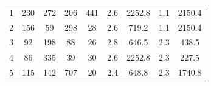 \begin{table}[ht!]
\begin{tabular}{ccccccccc}
		\multicolumn{1}{c|}{1}               & 230                                                          & 272                                                               & 206                                                              & \multicolumn{1}{c|}{441}                                                              & 2.6                                                           & 2252.8                                                             & 1.1                                                               & 2150.4                                                            \\
		\multicolumn{1}{c|}{2}               & 156                                                          & 59                                                                & 298                                                              & \multicolumn{1}{c|}{28}                                                               & 2.6                                                           & 719.2                                                              & 1.1                                                               & 2150.4                                                            \\
		\multicolumn{1}{c|}{3}               & 92                                                           & 198                                                               & 88                                                               & \multicolumn{1}{c|}{26}                                                               & 2.8                                                           & 646.5                                                              & 2.3                                                               & 438.5                                                             \\
		\multicolumn{1}{c|}{4}               & 86                                                           & 335                                                               & 39                                                               & \multicolumn{1}{c|}{30}                                                               & 2.6                                                           & 2252.8                                                             & 2.3                                                               & 227.5                                                             \\
		\multicolumn{1}{c|}{5}               & 115                                                          & 142                                                               & 707                                                              & \multicolumn{1}{c|}{20}                                                               & 2.4                                                           & 648.8                                                              & 2.3                                                               & 1740.8                                                            \\

\end{tabular}
\end{table}
